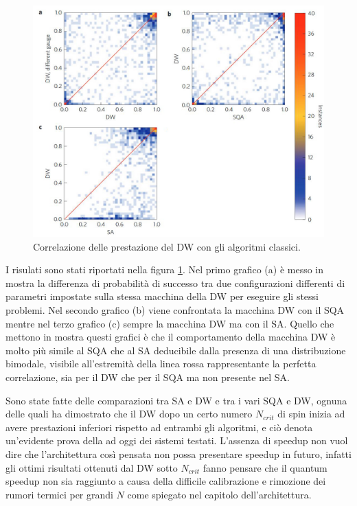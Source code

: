 \begin{figure}[htbp]
  \centering
  \includegraphics[scale=0.5]{Immagini/correlazione-dw.jpg}
  \caption{Correlazione delle prestazione del DW con gli algoritmi classici.}
  \label{figura:correlazione-dw}
\end{figure}

I risulati sono stati riportati nella figura \ref{figura:correlazione-dw}. Nel primo grafico (a) è messo in mostra la differenza di probabilità di successo tra due configurazioni differenti di parametri impostate sulla stessa macchina della DW per eseguire gli stessi problemi. Nel secondo grafico (b) viene confrontata la macchina DW con il SQA mentre nel terzo grafico (c) sempre la macchina DW ma con il SA. Quello che mettono in mostra questi grafici è che il comportamento della macchina DW è molto più simile al SQA che al SA deducibile dalla presenza di una distribuzione bimodale, visibile all'estremità della linea rossa rappresentante la perfetta correlazione, sia per il DW che per il SQA ma non presente nel SA.


Sono state fatte delle comparazioni tra SA e DW\cite{DDQS} e tra i vari SQA e DW\cite{QVC}, ognuna delle quali ha dimostrato che il DW dopo un certo numero $N_{crit}$ di spin inizia ad avere prestazioni inferiori rispetto ad entrambi gli algoritmi, e ciò denota un'evidente prova della  ad oggi dei sistemi testati. L'assenza di speedup non vuol dire che l'architettura così pensata non possa presentare speedup in futuro, infatti gli ottimi risultati ottenuti dal DW sotto $N_{crit}$ fanno pensare che il quantum speedup non sia raggiunto a causa della difficile calibrazione e rimozione dei rumori termici per grandi $N$ come spiegato nel capitolo dell'architettura.

